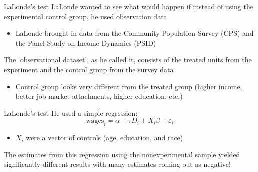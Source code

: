 \documentclass[aspectratio=169,t,11pt,table]{beamer}
\begin{document}
\begin{frame}{LaLonde's test}
  LaLonde wanted to see what would happen if instead of using the experimental control group, he used observation data
	\begin{itemize}
		\item LaLonde brought in data from the Community Population Survey (CPS) and the Panel Study on Income Dynamics (PSID)  
	\end{itemize}

	\bigskip
	The `observational dataset', as he called it, consists of the treated units from the experiment and the control group from the survey data
	\pause
	\begin{itemize}
		\item Control group looks very different from the treated group (higher income, better job market attachments, higher education, etc.)
	\end{itemize}
\end{frame}

\begin{frame}{LaLonde's test}
	He used a simple regression:
	$$
		\text{wages}_i = \alpha + \tau D_i + X_i \beta + \varepsilon_i
	$$
	\begin{itemize}
		\item $X_i$ were a vector of controls (age, education, and race)
	\end{itemize}

	\pause \bigskip
	The estimates from this regression using the nonexperimental sample yielded significantly different results with many estimates coming out as negative!
\end{frame}
\end{document}
